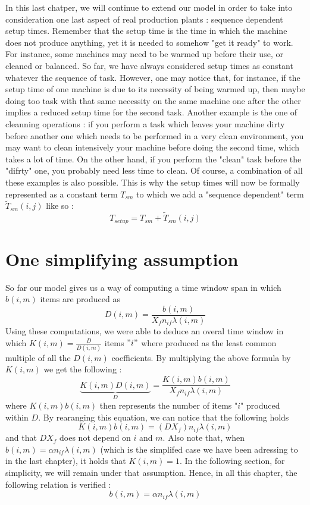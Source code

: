 In this last chatper, we will continue to extend our model in order to take into consideration one last aspect of real production plants : sequence dependent setup times. Remember that the setup time is the time in which the machine does not produce anything, yet it is needed to somehow "get it ready" to work. For instance, some machines may need to be warmed up before their use, or cleaned or balanced. So far, we have always considered setup times as constant whatever the sequence of task. However, one may notice that, for instance, if the setup time of one machine is due to its necessity of being warmed up, then maybe doing too task with that same necessity on the same machine one after the other implies a reduced setup time for the second task. Another example is the one of cleanning operations : if you perform a task which leaves your machine dirty before another one which needs to be performed in a very clean environment, you may want to clean intensively your machine before doing the second time, which takes a lot of time. On the other hand, if you perform the "clean" task before the "difrty" one, you probably need less time to clean. Of course, a combination of all these examples is also possible. This is why the setup times will now be formally represented as a constant term $T_{sm}$ to which we add a "sequence dependent" term $\tilde{T}_{sm}(i,j)$ like so : 
\[ T_{setup} = T_{sm} + \tilde{T}_{sm}(i,j) \]

\section{One simplifying assumption}

So far our model gives us a way of computing a time window span in which $b(i,m)$ items are produced as \[ D(i,m) = \frac{b(i,m)}{X_fn_{if}\lambda(i,m)} \] Using these computations, we were able to deduce an overal time window in which $K(i,m) = \frac{D}{D(i,m)}$ items $"i"$ where produced as the least common multiple of all the $D(i,m)$ coefficients. By multiplying the above formula by $K(i,m)$ we get the following :
\[
    \underbrace{K(i,m)D(i,m)}_{D} = \frac{K(i,m)b(i,m)}{X_fn_{if}\lambda(i,m)}
\]
where $K(i,m)b(i,m)$ then represents the number of items "$i$" produced within $D$. By rearanging this equation, we can notice that the following holds \[ K(i,m)b(i,m) = (DX_f)n_{if}\lambda(i,m) \] and that $DX_f$ does not depend on $i$ and $m$. Also note that, when $b(i,m) = \alpha n_{if}\lambda(i,m)$ (which is the simplifed case we have been adressing to in the last chapter), it holds that $K(i,m) = 1$. In the following section, for simplicity, we will remain under that assumption. Hence, in all this chapter, the following relation is verified : \[ b(i,m) = \alpha n_{if}\lambda(i,m) \]

